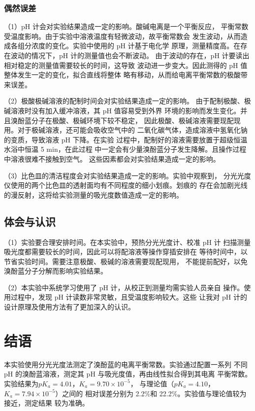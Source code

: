 \documentclass[12pt]{ctexart}
\numberwithin{equation}{section}
\begin{document}
\subsubsection{偶然误差}

（1）pH 计会对实验结果造成一定的影响。酸碱电离是一个平衡反应，
平衡常数受温度影响。由于实验中溶液温度有轻微波动，故平衡常数会
发生波动，从而造成各组分浓度的变化。实验中使用的 pH 计基于电化学
原理，测量精度高。在存在波动的情况下，pH 计的测量值也会不断波动。
由于波动的存在，pH 计要读出相对稳定的测量值需要较长的时间，这导致
波动进一步变大。因此测得的 pH 值整体发生一定的变化，拟合直线将整体
略有移动，从而给电离平衡常数的极酸带来误差。

（2）极酸极碱溶液的配制时间会对实验结果造成一定的影响。
由于配制极酸、极碱溶液时没有加入缓冲溶液，其 pH 值容易受到外界
环境的影响而发生变化。并且溴酚蓝分子在极酸、极碱环境下较不稳定，
因此极酸、极碱溶液需要现配现用。对于极碱溶液，还可能会吸收空气中的
二氧化碳气体，造成溶液中氢氧化钠的变质，导致溶液 pH 下降。在实验
过程中，配制好的溶液需要放置于超级恒温水浴中恒温 5 min，在此过程
中一定会有少量溴酚蓝分子发生降解。且操作过程中溶液很难不接触到空气。
这些因素都会对实验结果造成一定的影响。

（3）比色皿的清洁程度会对实验结果造成一定的影响。实验中观察到，
分光光度仪使用的两个比色皿的透射面均有不同程度的细小划痕。划痕的
存在会加剧光线的漫反射，这将给实验测量的吸光度数值造成一定的影响。

\subsection{体会与认识}

（1）实验要合理安排时间。在本实验中，预热分光光度计、校准 pH 计
扫描测量吸光度都需要较长的时间，因此可以将配溶液等操作穿插安排在
等待时间中，以节省实验时间。需要注意极酸、极碱的溶液需要现配现用，
不能提前配好，以免溴酚蓝分子分解而影响实验结果。

（2）本实验中系统学习使用了 pH 计，从校正到测量均需实验人员亲自
操作。使用过程中，发现 pH 计读数非常灵敏，且受温度影响较大。这些
让我对 pH 计的设计原理及使用方法有了更加深入的认识。

\section{结语}

本实验使用分光光度法测定了溴酚蓝的电离平衡常数。实验通过配置一系列
不同 pH 的溴酚蓝溶液，测定其 pH 与吸光度值，再由线性拟合得到其电离
平衡常数。实验结果为$pK_a = 4.01$，$K_a = 9.70 \times 10^{-5}$，
与理论值（$pK_a = 4.10$，$K_a = 7.94 \times 10^{-5}$）之间的
相对误差分别为 2.2\%和 22.2\%。实验值与理论值较为接近，测定结果
较为准确。
\end{document}
